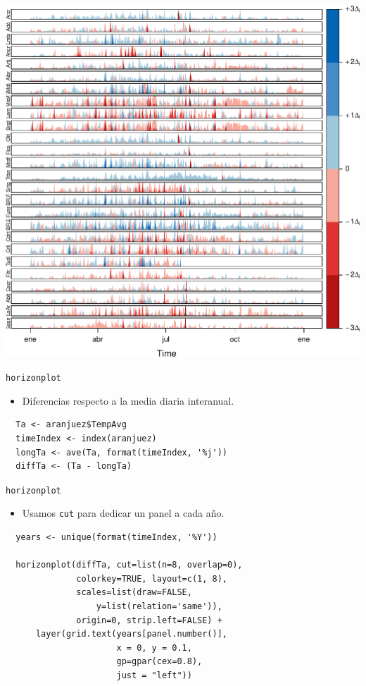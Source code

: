 \documentclass[xcolor={usenames,svgnames,dvipsnames}]{beamer}
\begin{document}
\begin{frame}[label=sec-3-3-4]{}
\includegraphics[width=.9\linewidth]{figs/navarraHorizonplot.pdf}
\end{frame}

\begin{frame}[fragile,label=sec-3-3-5]{\texttt{horizonplot}}
 \begin{itemize}
\item Diferencias respecto a la media diaria interanual.
\end{itemize}
\lstset{language=R,label= ,caption= ,numbers=none}
\begin{lstlisting}
  Ta <- aranjuez$TempAvg
  timeIndex <- index(aranjuez)
  longTa <- ave(Ta, format(timeIndex, '%j'))
  diffTa <- (Ta - longTa)
\end{lstlisting}
\end{frame}

\begin{frame}[fragile,label=sec-3-3-6]{\texttt{horizonplot}}
 \begin{itemize}
\item Usamos \texttt{cut} para dedicar un panel a cada año.
\end{itemize}
\lstset{language=R,label= ,caption= ,numbers=none}
\begin{lstlisting}
  years <- unique(format(timeIndex, '%Y'))
  
  horizonplot(diffTa, cut=list(n=8, overlap=0),
              colorkey=TRUE, layout=c(1, 8),
              scales=list(draw=FALSE,
                  y=list(relation='same')),
              origin=0, strip.left=FALSE) +
      layer(grid.text(years[panel.number()],
                      x = 0, y = 0.1, 
                      gp=gpar(cex=0.8),
                      just = "left"))
\end{lstlisting}
\end{frame}
\end{document}
